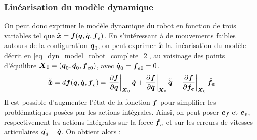 \documentclass[12pt, a4paper]{article} %
\numberwithin{equation}{section}
\begin{document}
	\subsubsection{Linéarisation du modèle dynamique} \label{sec_dyn_app_sub_linear}
	On peut donc exprimer le modèle dynamique du robot en fonction de trois variables tel que $ \ddot{\vect{x}} = \vect{f}(\vect{q}, \dot{\vect{q}}, \vect{f}_e) $. En s'intéressant à de mouvements faibles autours de la configuration  $ \vect{q}_0 $, on peut exprimer $ \tilde{\ddot{\vect{x}}} $ la linéarisation du modèle décrit en \cref{eq_dyn_model_robot_complete_2}, au voisinage des points d'équilibre $ \matr{X}_0 = \left( \vect{q}_0, \dot{\vect{q}_0}, \vect{f}_{e0} \right) $, avec $ \dot{\vect{q}}_0 = \vect{f}_{e0} = 0 $.
	\begin{equation} \label{eq_linearization_dyn}
	\tilde{\ddot{\vect{x}}} = d \vect{f}(\vect{q}, \dot{\vect{q}}, \vect{f}_e) = \left. \frac{\partial \vect{f}}{\partial \vect{q} } \right|_{\matr{X}_0} \tilde{\vect{q}} + \left. \frac{\partial \vect{f}}{\partial \dot{\vect{q}} } \right|_{\matr{X}_0} \tilde{\dot{\vect{q}}} + \left. \frac{\partial \vect{f}}{\partial \vect{f_e}} \right|_{\matr{X}_0} \tilde{\vect{f_e}}
	\end{equation}
	Il est possible d'augmenter l'état de la fonction $ \vect{f} $ pour simplifier les problématiques posées par les actions intégrales. Ainsi, on peut poser $ \vect{e}_f $ et $ \vect{e}_v $, respectivement les actions intégrales sur la force $ \vect{f}_e $ et sur les erreurs de vitesses articulaires $ \dot{\vect{q}_d} - \dot{\vect{q}} $. On obtient alors :
\end{document}
